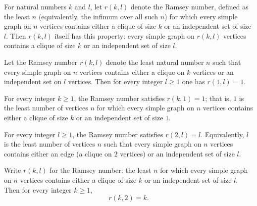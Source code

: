 \begin{theorem}
\label{SimpleGraph.isRamseyBound_ramseyNumber}
For natural numbers $k$ and $l$, let $r(k,l)$ denote the Ramsey number, defined as the
least $n$ (equivalently, the infimum over all such $n$) for which every simple graph on
$n$ vertices contains either a clique of size $k$ or an independent set of size $l$.
Then $r(k,l)$ itself has this property: every simple graph on $r(k,l)$ vertices contains
a clique of size $k$ or an independent set of size $l$.
\end{theorem}

\begin{theorem}
\label{SimpleGraph.ramseyNumber_one_left}
Let the Ramsey number $r(k,l)$ denote the least natural number $n$ such that every
simple graph on $n$ vertices contains either a clique on $k$ vertices or an independent
set on $l$ vertices. Then for every integer $l \ge 1$ one has $r(1,l) = 1$.
\end{theorem}

\begin{theorem}
\label{SimpleGraph.ramseyNumber_one_right}
For every integer $k \ge 1$, the Ramsey number satisfies $r(k, 1) = 1$; that is, $1$ is
the least number of vertices $n$ for which every simple graph on $n$ vertices contains
either a clique of size $k$ or an independent set of size $1$.
\end{theorem}

\begin{theorem}
\label{SimpleGraph.ramseyNumber_two_left}
For every integer $l \ge 1$, the Ramsey number satisfies $r(2, l) = l$. Equivalently,
$l$ is the least number of vertices $n$ such that every simple graph on $n$ vertices
contains either an edge (a clique on $2$ vertices) or an independent set of size $l$.
\end{theorem}

\begin{theorem}
\label{SimpleGraph.ramseyNumber_two_right}
Write $r(k,l)$ for the Ramsey number: the least $n$ for which every simple graph on $n$
vertices contains either a clique of size $k$ or an independent set of size $l$. Then
for every integer $k \ge 1$,
\[
r(k, 2) = k.
\]
\end{theorem}


